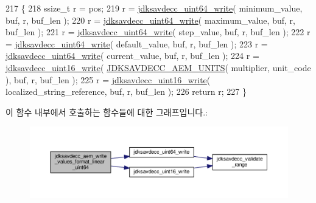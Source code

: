 \begin{DoxyCode}
217 \{
218     ssize\_t r = pos;
219     r = \hyperlink{group__endian_gaa294fd85c2d887032dad294c6833c903}{jdksavdecc\_uint64\_write}( minimum\_value, buf, r, buf\_len );
220     r = \hyperlink{group__endian_gaa294fd85c2d887032dad294c6833c903}{jdksavdecc\_uint64\_write}( maximum\_value, buf, r, buf\_len );
221     r = \hyperlink{group__endian_gaa294fd85c2d887032dad294c6833c903}{jdksavdecc\_uint64\_write}( step\_value, buf, r, buf\_len );
222     r = \hyperlink{group__endian_gaa294fd85c2d887032dad294c6833c903}{jdksavdecc\_uint64\_write}( default\_value, buf, r, buf\_len );
223     r = \hyperlink{group__endian_gaa294fd85c2d887032dad294c6833c903}{jdksavdecc\_uint64\_write}( current\_value, buf, r, buf\_len );
224     r = \hyperlink{group__endian_ga4c0851ce17bde5306fdb04bfb5b75af1}{jdksavdecc\_uint16\_write}( \hyperlink{group__aem__descriptor_gae5f7498f6048b4dda1aca923b0eae0f6}{JDKSAVDECC\_AEM\_UNITS}( 
      multiplier, unit\_code ), buf, r, buf\_len );
225     r = \hyperlink{group__endian_ga4c0851ce17bde5306fdb04bfb5b75af1}{jdksavdecc\_uint16\_write}( localized\_string\_reference, buf, r, buf\_len );
226     \textcolor{keywordflow}{return} r;
227 \}
\end{DoxyCode}


이 함수 내부에서 호출하는 함수들에 대한 그래프입니다.\+:
\nopagebreak
\begin{figure}[H]
\begin{center}
\leavevmode
\includegraphics[width=350pt]{group__aem__descriptor_gaa26a600317bbc52448ee16c65f7df2fd_cgraph}
\end{center}
\end{figure}


